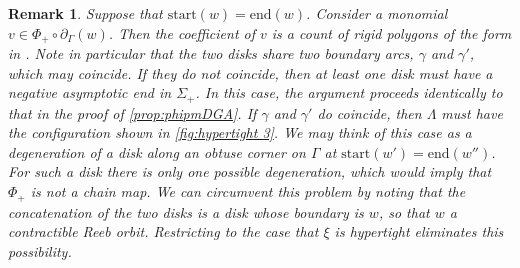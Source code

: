 \documentclass[10pt,a4paper]{amsart}
\newtheorem{remark}{Remark}
\begin{document}
\begin{remark}\label{rem: why hypertight} Suppose that $\text{start}(w) = \text{end}(w)$. Consider a monomial $v\in \Phi_+\circ \partial_\Gamma(w)$. Then the coefficient of $v$ is a count of rigid polygons of the form in . Note in particular that the two disks share two boundary arcs, $\gamma$ and $\gamma'$, which  may coincide. If they do not coincide, then at least one disk must have a negative asymptotic end in $\Sigma_+$. In this case, the argument proceeds identically to that in the proof of \cref{prop:phipmDGA}. If $\gamma$ and $\gamma'$ do coincide, then $\Lambda$ must have the configuration shown in \cref{fig:hypertight 3}. We may think of this case as a degeneration of a disk along an obtuse corner on $\Gamma$ at $\text{start}(w') = \text{end}(w'')$. For such a disk there is only one possible degeneration, which would imply that $\Phi_+$ is not a chain map. We can circumvent this problem by noting that the concatenation of the two disks is a disk whose boundary is $w$, so that $w$ a contractible Reeb orbit. Restricting to the case that $\xi$ is hypertight eliminates this possibility. 

\begin{figure}[h]
    \begin{minipage}{0.48\textwidth}
        \centering
\begin{tikzpicture}[x=0.55pt,y=0.55pt,yscale=-1,xscale=1]


\end{tikzpicture}
\end{minipage}
\end{figure}
\end{remark}
\end{document}
